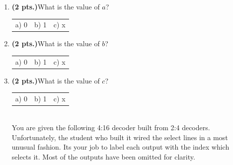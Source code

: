 \documentclass{article}
\begin{document}
\begin{enumerate}
\item {\bf (2 pts.)}What is the value of $a$?

\begin{tabular}{p{0.6in} p{0.6in} p{0.6in}}
a) 0 & b) 1 & c) x 
\end{tabular}

\item {\bf (2 pts.)}What is the value of $b$?

\begin{tabular}{p{0.6in} p{0.6in} p{0.6in}}
a) 0 & b) 1 & c) x 
\end{tabular}

\item {\bf (2 pts.)}What is the value of $c$?

\begin{tabular}{p{0.6in} p{0.6in} p{0.6in}}
a) 0 & b) 1 & c) x 
\end{tabular} \\

\pagebreak
You are given the following 4:16 decoder built from 2:4 decoders.
Unfortunately, the student who built it wired the select lines in a
most unusual fashion.  Its your job to label each output with the
index which selects it.  Most of the outputs have been omitted
for clarity.



\end{enumerate}
\end{document}
